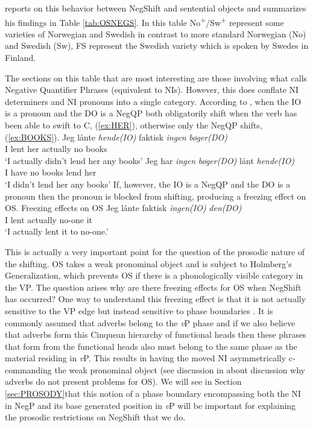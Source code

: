 \documentclass[12pt, letterpaper]{article}
\begin{document}
\citet{christensenInterfacesNegationSyntax2005} reports on this behavior between NegShift and sentential objects and summarizes his findings in Table \ref{tab:OSNEGS}. In this table No\textsuperscript{+}/Sw\textsuperscript{+} represent some varieties of Norwegian and Swedish in contrast to more standard Norwegian (No) and Swedish (Sw), FS represent the Swedish variety which is spoken by Swedes in Finland.

The sections on this table that are most interesting are those involving what \citeauthor{christensenInterfacesNegationSyntax2005} calls Negative Quantifier Phrases (equivalent to NIs). However, this does conflate NI determiners and NI pronouns into a single category. According to \citeauthor{christensenInterfacesNegationSyntax2005}, when the IO is a pronoun and the DO is a NegQP both obligatorily shift when the verb has been able to swift to C, (\ref{ex:HER}), otherwise only the NegQP shifts, (\ref{ex:BOOKS}).
	\ea 
		\ea \label{ex:HER}
		\gll Jeg lånte \textit{hende(IO)} faktisk \textit{ingen} \textit{bøger(DO)}\\
		I lent her actually no books\\
		\glt `I actually didn't lend her any books'
		\ex \label{ex:BOOKS}
		\gll Jeg har \textit{ingen} \textit{bøger(DO)} lånt \textit{hende(IO)}\\
		I have no books lend her\\
		\glt `I didn't lend her any books'
		\z 
	\z 
If, however, the IO is a NegQP and the DO is a pronoun then the pronoun is blocked from shifting, producing a freezing effect on OS.
	\ea Freezing effects on OS
		\ea 
		\gll Jeg lånte faktisk \textit{ingen(IO)} \textit{den(DO)}\\
		I lent actually no-one it\\
		\glt `I actually lent it to no-one.'
		\z 
	\z

This is actually a very important point for the question of the prosodic nature of the shifting. OS takes a weak pronominal object and is subject to Holmberg's Generalization, which prevents OS if there is a phonologically visible category in the VP. The question arises why are there freezing effects for OS when NegShift has occurred? One way to understand this freezing effect is that it is not actually sensitive to the VP edge but instead sensitive to phase boundaries \citep{chomskyMinimalistInquiriesFramework2000,chomskyDerivationPhase2001,chomskyPhases2008}. It is commonly assumed that adverbs belong to the \emph{v}P phase and if we also believe that adverbs form this Cinquean hierarchy of functional heads then these phrases that form from the functional heads also must belong to the same phase as the material residing in \emph{v}P. This results in having the moved NI asymmetrically c-commanding the weak pronominal object (see discussion in \cite{brinkerhoffMATCHINGPhrasesNorwegian2021} about discussion why adverbs do not present problems for OS). We will see in Section \ref{sec:PROSODY}that this notion of a phase boundary encompassing both the NI in NegP and its base generated position in \emph{v}P will be important for explaining the prosodic restrictions on NegShift that we do.
\end{document}
